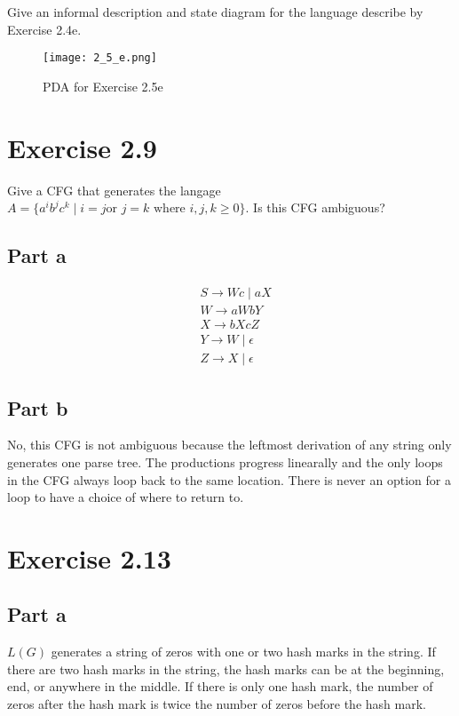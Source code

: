 \documentclass{article}
\newcommand{\where}{\mid}
\begin{document}
Give an informal description and state diagram for the language describe by
Exercise 2.4e.

\begin{figure}[h!]
	\centering
	\texttt{[image: 2\_5\_e.png]}
	\caption{PDA for Exercise 2.5e}
\end{figure}

\section{Exercise 2.9}

Give a CFG that generates the langage $A = \{ a^i b^j c^k \where i = j \text{
or } j = k \text{ where } i, j, k \geq 0 \}$. Is this CFG ambiguous?

\subsection{Part a}

\begin{align*}
	& S \rightarrow Wc \mid aX\\
	& W \rightarrow aWbY\\
	& X \rightarrow bXcZ\\
	& Y \rightarrow W \mid \epsilon\\
	& Z \rightarrow X \mid \epsilon
\end{align*}

\subsection{Part b}

No, this CFG is not ambiguous because the leftmost derivation of any string
only generates one parse tree. The productions progress linearally and the only
loops in the CFG always loop back to the same location. There is never an option
for a loop to have a choice of where to return to.

\section{Exercise 2.13}

\subsection{Part a}

$L(G)$ generates a string of zeros with one or two hash marks in the string.
If there are two hash marks in the string, the hash marks can be at the
beginning, end, or anywhere in the middle. If there is only one hash mark, the
number of zeros after the hash mark is twice the number of zeros before the hash mark.
\end{document}
